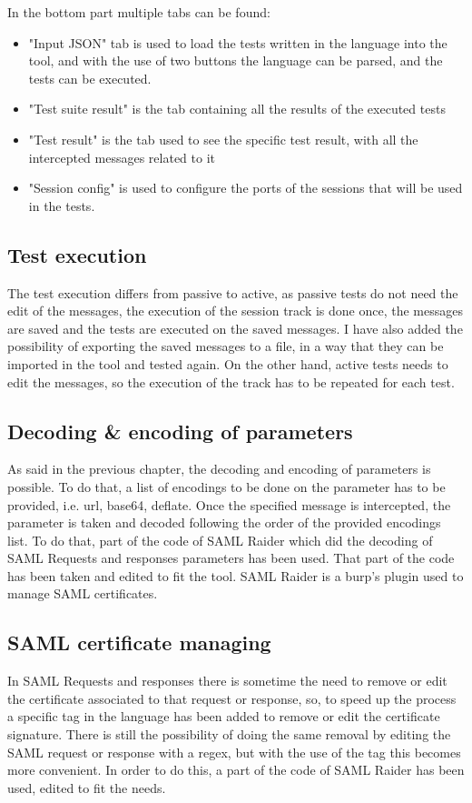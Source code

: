 In the bottom part multiple tabs can be found:
\begin{itemize}
    \item "Input JSON" tab is used to load the tests written in the language into the tool, and with the use of two buttons the language can be parsed, and the tests can be executed.
    \item "Test suite result" is the tab containing all the results of the executed tests
    \item "Test result" is the tab used to see the specific test result, with all the intercepted messages related to it
    \item "Session config" is used to configure the ports of the sessions that will be used in the tests.
\end{itemize}

\subsection{Test execution}
The test execution differs from passive to active, as passive tests do not need the edit of the messages, the execution of the \gls{session track} is done once, the messages are saved and the tests are executed on the saved messages. I have also added the possibility of exporting the saved messages to a file, in a way that they can be imported in the tool and tested again.
On the other hand, active tests needs to edit the messages, so the execution of the track has to be repeated for each test.

\subsection{Decoding \& encoding of parameters}
As said in the previous chapter, the decoding and encoding of parameters is possible. To do that, a list of encodings to be done on the parameter has to be provided, i.e. url, base64, deflate. Once the specified message is intercepted, the parameter is taken and decoded following the order of the provided encodings list. To do that, part of the code of SAML Raider \cite{saml_raider} which did the decoding of \Gls{SAML} Requests and responses parameters has been used. That part of the code has been taken and edited to fit the tool. SAML Raider is a \Gls{burp}'s plugin used to manage \Gls{SAML} certificates.

\subsection{SAML certificate managing}
In \Gls{SAML} Requests and responses there is sometime the need to remove or edit the certificate associated to that request or response, so, to speed up the process a specific tag in the language has been added to remove or edit the certificate signature. There is still the possibility of doing the same removal by editing the \Gls{SAML} request or response with a regex, but with the use of the tag this becomes more convenient.
In order to do this, a part of the code of SAML Raider \cite{saml_raider} has been used, edited to fit the needs.

